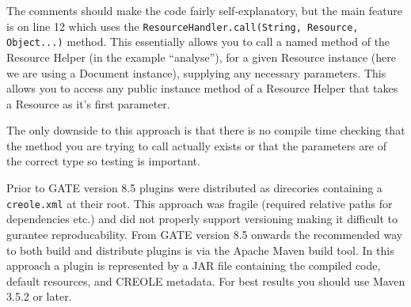 The comments should make the code fairly self-explanatory, but the main feature
is on line 12 which uses the \lstinline!ResourceHandler.call(String, Resource, Object...)!
method. This essentially allows you to call a named method of the Resource Helper
(in the example ``analyse''), for a given Resource instance (here we are using a
Document instance), supplying any necessary parameters. This allows you to
access any public instance method of a Resource Helper that takes a Resource as
it's first parameter.

The only downside to this approach is that there is no compile time checking
that the method you are trying to call actually exists or that the parameters
are of the correct type so testing is important.


Prior to GATE version 8.5 plugins were distributed as direcories containing
a \verb!creole.xml! at their root. This approach was fragile (required relative
paths for dependencies etc.) and did not properly support versioning making it
difficult to gurantee reproducability. From GATE version 8.5 onwards the recommended
way to both build and distribute plugins is via the Apache Maven build tool.
In this approach a plugin is represented by a JAR file containing the compiled code,
default resources, and CREOLE metadata.  For best results you should use
Maven 3.5.2 or later.

